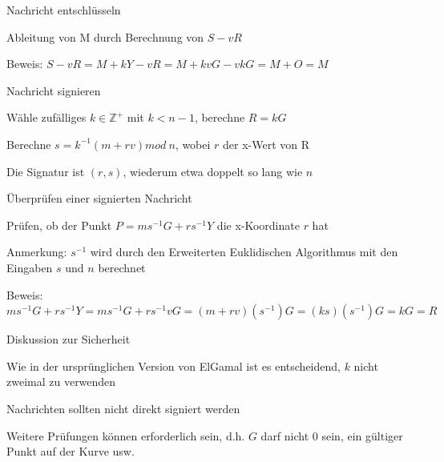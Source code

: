 \documentclass[a4paper]{article}
\begin{document}
\begin{multicols}{3}
\begin{itemize*}
            \item Nachricht entschlüsseln
            \begin{itemize*}
                  \item Ableitung von M durch Berechnung von $S-vR$
                  \item Beweis: $S-vR=M+kY-vR =M+kvG-vkG= M+O= M$
            \end{itemize*}
            \item Nachricht signieren
            \begin{itemize*}
                  \item Wähle zufälliges $k\in\mathbb{Z}^+$ mit $k<n-1$, berechne $R=kG$
                  \item Berechne $s=k^{-1}(m+rv) mod\ n$, wobei $r$ der x-Wert von R
                  \item Die Signatur ist $(r,s)$, wiederum etwa doppelt so lang wie $n$
            \end{itemize*}
            \item Überprüfen einer signierten Nachricht
            \begin{itemize*}
                  \item Prüfen, ob der Punkt $P=ms^{-1}G+rs^{-1}Y$ die x-Koordinate $r$ hat
                  \item Anmerkung: $s^{-1}$ wird durch den Erweiterten Euklidischen Algorithmus mit den Eingaben $s$ und $n$ berechnet
                  \item Beweis: $ms^{-1}G+rs^{-1}Y = ms^{-1}G+rs^{-1}vG = (m+rv)(s^{-1})G = (ks)(s^{-1})G = kG = R$
            \end{itemize*}
            \item Diskussion zur Sicherheit
            \begin{itemize*}
                  \item Wie in der ursprünglichen Version von ElGamal ist es entscheidend, $k$ nicht zweimal zu verwenden
                  \item Nachrichten sollten nicht direkt signiert werden
                  \item Weitere Prüfungen können erforderlich sein, d.h. $G$ darf nicht $0$ sein, ein gültiger Punkt auf der Kurve usw.
            \end{itemize*}
      \end{itemize*}


\end{multicols}
\end{document}
